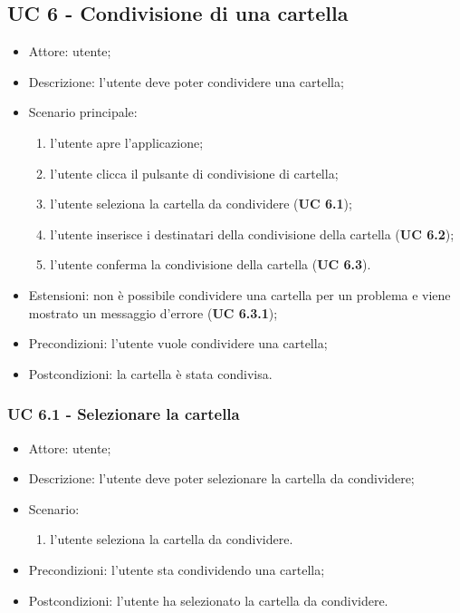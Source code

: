     \subsection{UC 6 - Condivisione di una cartella}
    \begin{itemize}
        \item Attore: utente;
        \item Descrizione: l'utente deve poter condividere una cartella;
        \item Scenario principale:
            \begin{enumerate}
            \item l’utente apre l’applicazione;
            \item l’utente clicca il pulsante di condivisione di cartella;
            \item l'utente seleziona la cartella da condividere (\textbf{UC 6.1});
            \item l'utente inserisce i destinatari della condivisione della cartella (\textbf{UC 6.2});   
            \item l'utente conferma la condivisione della cartella (\textbf{UC 6.3}).          
            \end{enumerate}
        \item Estensioni: non è possibile condividere una cartella per un problema e viene mostrato un messaggio d'errore (\textbf{UC 6.3.1});
        \item Precondizioni: l'utente vuole condividere una cartella;
        \item Postcondizioni: la cartella è stata condivisa.
    \end{itemize}

    \subsubsection{UC 6.1 - Selezionare la cartella}
    \begin{itemize}
        \item Attore: utente;
        \item Descrizione: l'utente deve poter selezionare la cartella da condividere;
        \item Scenario:
        \begin{enumerate}
        \item l'utente seleziona la cartella da condividere.
        \end{enumerate}
        \item Precondizioni: l'utente sta condividendo una cartella;
        \item Postcondizioni: l'utente ha selezionato la cartella da condividere.
    \end{itemize}
